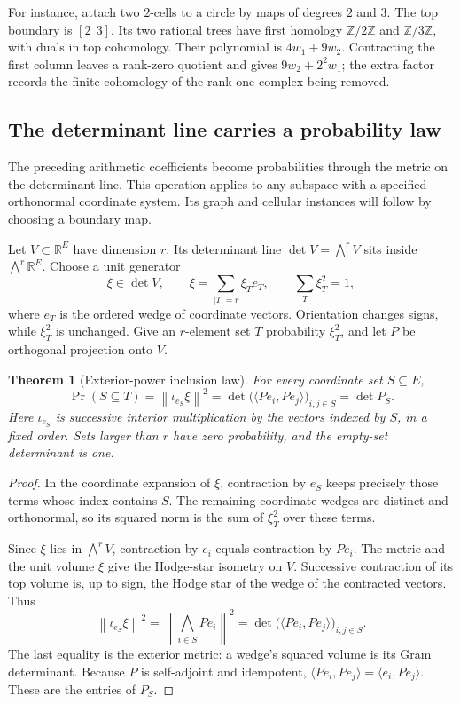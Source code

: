 \documentclass[11pt]{article}
\newtheorem{theorem}{Theorem}[section]
\theoremstyle{definition}
\theoremstyle{remark}
\newcommand{\Z}{\mathbb Z}
\newcommand{\R}{\mathbb R}
\begin{document}
For instance, attach two \(2\)-cells to a circle by maps of degrees
\(2\) and \(3\). The top boundary is \([2\ \ 3]\). Its two rational
trees have first homology \(\Z/2\Z\) and \(\Z/3\Z\), with duals in
top cohomology. Their polynomial is \(4w_1+9w_2\). Contracting the
first column leaves a rank-zero quotient and gives
\(9w_2+2^2w_1\); the extra factor records the finite cohomology of
the rank-one complex being removed.

\subsection{The determinant line carries a probability law}
\label{sec:derived-exterior-probability}

The preceding arithmetic coefficients become probabilities through the metric on the determinant line. This operation applies to any subspace with a specified orthonormal coordinate system. Its graph and cellular instances will follow by choosing a boundary map.

Let $V\subset\R^E$ have dimension $r$. Its determinant line $\det V=\bigwedge^rV$ sits inside $\bigwedge^r\R^E$. Choose a unit generator
\[
 \xi\in\det V,\qquad
 \xi=\sum_{|T|=r}\xi_T e_T,
 \qquad\sum_T\xi_T^2=1,
\]
where $e_T$ is the ordered wedge of coordinate vectors. Orientation changes signs, while $\xi_T^2$ is unchanged. Give an $r$-element set $T$ probability $\xi_T^2$, and let $P$ be orthogonal projection onto $V$.

\begin{theorem}[Exterior-power inclusion law]\label{thm:derived-exterior-law}
For every coordinate set $S\subseteq E$,
\[
 \Pr(S\subseteq T)
 =\left\|\iota_{e_S}\xi\right\|^2
 =\det\bigl(\langle Pe_i,Pe_j\rangle\bigr)_{i,j\in S}
 =\det P_S.
\]
Here $\iota_{e_S}$ is successive interior multiplication by the vectors indexed by $S$, in a fixed order. Sets larger than $r$ have zero probability, and the empty-set determinant is one.
\end{theorem}
\begin{proof}
In the coordinate expansion of $\xi$, contraction by $e_S$ keeps precisely those terms whose index contains $S$. The remaining coordinate wedges are distinct and orthonormal, so its squared norm is the sum of $\xi_T^2$ over these terms.

Since $\xi$ lies in $\bigwedge^rV$, contraction by $e_i$ equals contraction by $Pe_i$. The metric and the unit volume $\xi$ give the Hodge-star isometry on $V$. Successive contraction of its top volume is, up to sign, the Hodge star of the wedge of the contracted vectors. Thus
\[
 \left\|\iota_{e_S}\xi\right\|^2
 =\left\|\bigwedge_{i\in S}Pe_i\right\|^2
 =\det\bigl(\langle Pe_i,Pe_j\rangle\bigr)_{i,j\in S}.
\]
The last equality is the exterior metric: a wedge's squared volume is its Gram determinant. Because $P$ is self-adjoint and idempotent, $\langle Pe_i,Pe_j\rangle=\langle e_i,Pe_j\rangle$. These are the entries of $P_S$.
\end{proof}
\end{document}
